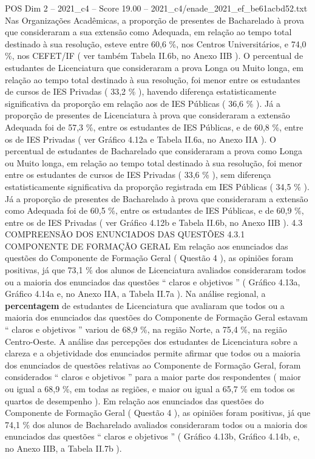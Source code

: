 \begin{textsample}{POS Dim 2 – 2021\_c4 – Score 19.00 – 2021\_c4/enade\_2021\_ef\_be61acbd52.txt}
Nas Organizações Acadêmicas, a proporção de presentes de Bacharelado à prova que consideraram a sua extensão como Adequada, em relação ao tempo total destinado à sua resolução, esteve entre 60,6 \%, nos Centros Universitários, e 74,0 \%, nos CEFET/IF ( ver também Tabela II.6b, no Anexo IIB ).
O percentual de estudantes de Licenciatura que consideraram a prova Longa ou Muito longa, em relação ao tempo total destinado à sua resolução, foi menor entre os estudantes de cursos de IES Privadas ( 33,2 \% ), havendo diferença estatisticamente significativa da proporção em relação aos de IES Públicas ( 36,6 \% ).
Já a proporção de presentes de Licenciatura à prova que consideraram a extensão Adequada foi de 57,3 \%, entre os estudantes de IES Públicas, e de 60,8 \%, entre os de IES Privadas ( ver Gráfico 4.12a e Tabela II.6a, no Anexo IIA ).
O percentual de estudantes de Bacharelado que consideraram a prova como Longa ou Muito longa, em relação ao tempo total destinado à sua resolução, foi menor entre os estudantes de cursos de IES Privadas ( 33,6 \% ), sem diferença estatisticamente significativa da proporção registrada em IES Públicas ( 34,5 \% ).
Já a proporção de presentes de Bacharelado à prova que consideraram a extensão como Adequada foi de 60,5 \%, entre os estudantes de IES Públicas, e de 60,9 \%, entre os de IES Privadas ( ver Gráfico 4.12b e Tabela II.6b, no Anexo IIB ). 4.3 COMPREENSÃO DOS ENUNCIADOS DAS QUESTÕES 4.3.1 COMPONENTE DE FORMAÇÃO GERAL Em relação aos enunciados das questões do Componente de Formação Geral ( Questão 4 ), as opiniões foram positivas, já que 73,1 \% dos alunos de Licenciatura avaliados consideraram todos ou a maioria dos enunciados das questões “ claros e objetivos ” ( Gráfico 4.13a, Gráfico 4.14a e, no Anexo IIA, a Tabela II.7a ).
Na análise regional, a \textbf{percentagem} de estudantes de Licenciatura que avaliaram que todos ou a maioria dos enunciados das questões do Componente de Formação Geral estavam “ claros e objetivos ” variou de 68,9 \%, na região Norte, a 75,4 \%, na região Centro-Oeste.
A análise das percepções dos estudantes de Licenciatura sobre a clareza e a objetividade dos enunciados permite afirmar que todos ou a maioria dos enunciados de questões relativas ao Componente de Formação Geral, foram considerados “ claros e objetivos ” para a maior parte dos respondentes ( maior ou igual a 68,9 \%, em todas as regiões, e maior ou igual a 65,7 \% em todos os quartos de desempenho ).
Em relação aos enunciados das questões do Componente de Formação Geral ( Questão 4 ), as opiniões foram positivas, já que 74,1 \% dos alunos de Bacharelado avaliados consideraram todos ou a maioria dos enunciados das questões “ claros e objetivos ” ( Gráfico 4.13b, Gráfico 4.14b, e, no Anexo IIB, a Tabela II.7b ).

\end{textsample}
